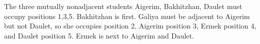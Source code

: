 The three mutually nonadjacent students Aigerim, Bakhitzhan, Daulet must occupy positions 1,3,5. Bakhitzhan is first. Galiya must be adjacent to Aigerim but not Daulet, so she occupies position 2, Aigerim position 3, Ermek position 4, and Daulet position 5. Ermek is next to $\boxed{\text{Aigerim and Daulet}}$.
